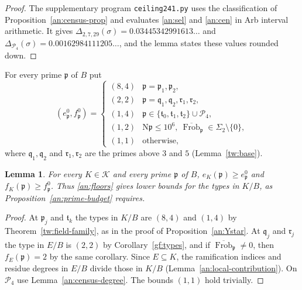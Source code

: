 \documentclass[11pt]{amsart}
\numberwithin{equation}{section}
\newtheorem{lemma}[equation]{Lemma}
\theoremstyle{definition}
\theoremstyle{remark}
\DeclareMathOperator{\Frob}{Frob}
\begin{document}
\begin{proof}
The supplementary program \texttt{ceiling241.py} uses the classification of
Proposition~\ref{an:census-prop} and evaluates \eqref{an:sel} and
\eqref{an:cen} in Arb interval arithmetic. It gives
$\Delta_{2,7,29}(\sigma)=0.03445342991613\ldots$ and
$\Delta_{\mathcal P_4}(\sigma)=0.00162984111205\ldots$, and the lemma states
these values rounded down.
\end{proof}

For every prime $\mathfrak p$ of $B$ put
\begin{equation}\label{an:floors}
 (e^0_{\mathfrak p},f^0_{\mathfrak p})=
 \begin{cases}
 (8,4)&\mathfrak p=\mathfrak p_1,\mathfrak p_2,\\
 (2,2)&\mathfrak p=\mathfrak q_1,\mathfrak q_2,\mathfrak r_1,\mathfrak r_2,\\
 (1,4)&\mathfrak p\in\{\mathfrak t_0,\mathfrak t_1,\mathfrak t_2\}\cup\mathcal P_4,\\
 (1,2)&\mathrm N\mathfrak p\le10^6,\ \overline{\Frob}_{\mathfrak p}\in\Sigma_2\setminus\{0\},\\
 (1,1)&\text{otherwise},
 \end{cases}
\end{equation}
where $\mathfrak q_1,\mathfrak q_2$ and $\mathfrak r_1,\mathfrak r_2$ are the
primes above $3$ and $5$ (Lemma~\ref{tw:base}).

\begin{lemma}\label{an:floors-valid}
For every $K\in\mathcal K$ and every prime $\mathfrak p$ of $B$,
$e_K(\mathfrak p)\ge e^0_{\mathfrak p}$ and
$f_K(\mathfrak p)\ge f^0_{\mathfrak p}$. Thus \eqref{an:floors} gives lower
bounds for the types in $K/B$, as Proposition~\ref{an:prime-budget}
requires.
\end{lemma}

\begin{proof}
At $\mathfrak p_j$ and $\mathfrak t_k$ the types in $K/B$ are $(8,4)$ and
$(1,4)$ by Theorem~\ref{tw:field-family}, as in the proof of
Proposition~\ref{an:Ystar}. At $\mathfrak q_j$ and $\mathfrak r_j$ the type
in $E/B$ is $(2,2)$ by Corollary~\ref{gf:types}, and if
$\overline{\Frob}_{\mathfrak p}\ne0$, then $f_E(\mathfrak p)=2$ by the same corollary.
Since $E\subseteq K$, the ramification indices and residue degrees in $E/B$
divide those in $K/B$ (Lemma~\ref{an:local-contribution}). On
$\mathcal P_4$ use Lemma~\ref{an:census-degree}. The bounds $(1,1)$ hold
trivially.
\end{proof}
\end{document}
